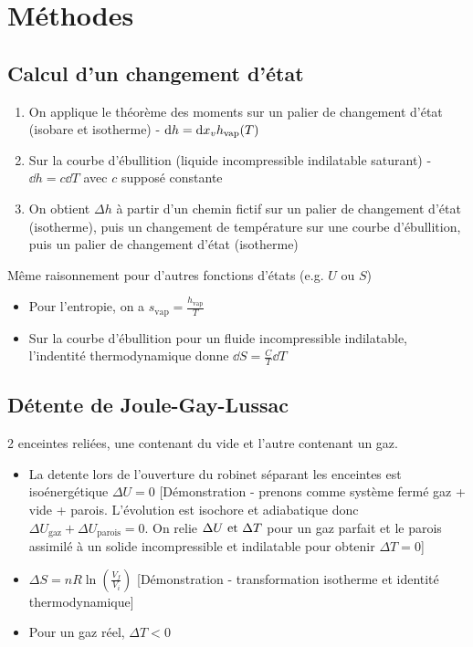 \documentclass[openany]{book}
\begin{document}
\section{Méthodes}
\subsection{Calcul d'un changement d'état}
\begin{enumerate}
    \item On applique le théorème des moments sur un palier de changement d'état (isobare et isotherme) - $\text{d} h = \text{d}x_v h_{\text{vap}}(T)$ 
    \item Sur la courbe d'ébullition (liquide incompressible indilatable saturant) - $ \dd h = c \dd T $ avec $c$ supposé constante
    \item On obtient $\Delta h$ à partir d'un chemin fictif sur un palier de changement d'état (isotherme), puis un changement de température sur une courbe d'ébullition, puis un palier de changement d'état (isotherme)
\end{enumerate}

Même raisonnement pour d'autres fonctions d'états (e.g. $U$ ou $S$)

\begin{itemize}
    \item Pour l'entropie, on a $s_{\text{vap}} = \frac{h_{\text{vap}}}{T}$
    \item Sur la courbe d'ébullition pour un fluide incompressible indilatable, l'indentité thermodynamique donne $\dd S = \frac{C}{T} \dd T$
\end{itemize}

\subsection{Détente de Joule-Gay-Lussac}
2 enceintes reliées, une contenant du vide et l'autre contenant un gaz. 

\begin{itemize}
    \item La detente lors de l'ouverture du robinet séparant les enceintes est isoénergétique $\Delta U = 0$ [Démonstration - prenons comme système fermé {gaz + vide + parois}. L'évolution est isochore et adiabatique donc $\Delta U_{\text{gaz}} + \Delta U_{\text{parois}} = 0$. On relie $\Delta U \text{ et } \Delta T$ pour un gaz parfait et le parois assimilé à un solide incompressible et indilatable pour obtenir $\Delta T = 0$]
    \item $\Delta S = nR \ln(\frac{V_f}{V_i})$ [Démonstration - transformation isotherme et identité thermodynamique]
    \item Pour un gaz réel, $\Delta T < 0$
\end{itemize}
\end{document}
